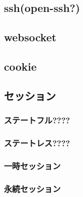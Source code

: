     \subsection{ssh(open-ssh?)}
    \subsection{websocket}
    \subsection{cookie}
    \subsection{セッション}
        \subsubsection{ステートフル????}
        \subsubsection{ステートレス????}
        \subsubsection{一時セッション}%
        \subsubsection{永続セッション}%
